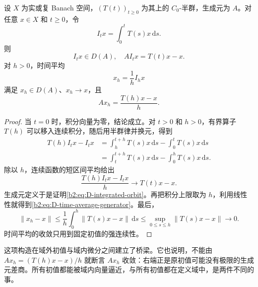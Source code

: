 \begin{proposition}[积分轨道进入定义域]\label{b2:prop:D-integrated-orbit}
设 \(X\) 为实或复 Banach 空间，\((T(t))_{t\geq0}\) 为其上的 \(C_0\)-半群，生成元为 \(A\)。对任意 \(x\in X\) 和 \(t\geq0\)，令
\[
 I_t x=\int_0^tT(s)x\,\mathrm ds.
\]
则
\begin{equation}\label{b2:eq:D-integrated-orbit}
 I_t x\in D(A),\quad AI_t x=T(t)x-x.
\end{equation}
对 \(h>0\)，时间平均
\[
 x_h=\frac1h I_hx
\]
满足 \(x_h\in D(A)\)、\(x_h\to x\)，且
\begin{equation}\label{b2:eq:D-time-average-generator}
 Ax_h=\frac{T(h)x-x}{h}.
\end{equation}
\end{proposition}
\begin{proof}
当 \(t=0\) 时，积分向量为零，结论成立。对 \(t>0\) 和 \(h>0\)，有界算子 \(T(h)\) 可以移入连续积分，随后用半群律并换元，得到
\[
 \begin{aligned}
 T(h)I_t x-I_t x
 &=\int_h^{t+h}T(s)x\,\mathrm ds-\int_0^tT(s)x\,\mathrm ds\\
 &=\int_t^{t+h}T(s)x\,\mathrm ds-\int_0^hT(s)x\,\mathrm ds.
 \end{aligned}
\]
除以 \(h\)，连续函数的短区间平均给出
\[
 \frac{T(h)I_t x-I_t x}{h}\longrightarrow T(t)x-x.
\]
生成元定义于是证明\eqref{b2:eq:D-integrated-orbit}。再把积分上限取为 \(h\)，利用线性性就得到\eqref{b2:eq:D-time-average-generator}。最后，
\[
 \|x_h-x\|
 \leq\frac1h\int_0^h\|T(s)x-x\|\,\mathrm ds
 \leq\sup_{0\leq s\leq h}\|T(s)x-x\|\longrightarrow0.
\]
时间平均的收敛只用到固定初值的强连续性。
\end{proof}
这项构造在域外初值与域内微分之间建立了桥梁。它也说明，不能由 \(Ax_h=(T(h)x-x)/h\) 就断言 \(Ax_h\) 收敛：右端正是原初值可能没有极限的生成元差商。所有初值都能被域内向量逼近，与所有初值都在定义域中，是两件不同的事。

